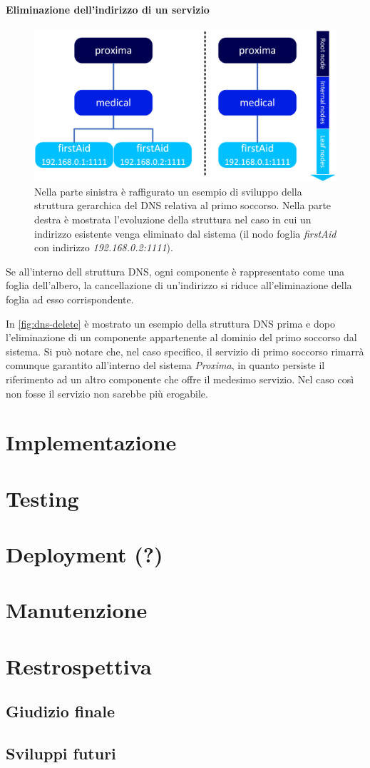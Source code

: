 \documentclass[a4paper,12pt]{report}
\begin{document}
\subsubsection{Eliminazione dell'indirizzo di un servizio}
\begin{figure}[H]
	\centering
	\includegraphics[scale=0.7]{./img/dns-delete.png}
	\caption{Nella parte sinistra è raffigurato un esempio di sviluppo della struttura gerarchica del DNS relativa al primo soccorso. Nella parte destra è mostrata l'evoluzione della struttura nel caso in cui un indirizzo esistente venga eliminato dal sistema (il nodo foglia \emph{firstAid} con indirizzo \emph{192.168.0.2:1111}). }
	\label{fig:dns-delete}
\end{figure}
Se all'interno dell struttura DNS, ogni componente è rappresentato come una foglia dell'albero, la cancellazione di un'indirizzo si riduce all'eliminazione della foglia ad esso corrispondente. 

In \autoref{fig:dns-delete} è mostrato un esempio della struttura DNS prima e dopo l'eliminazione di un componente appartenente al dominio del primo soccorso dal sistema. Si può notare che, nel caso specifico, il servizio di primo soccorso rimarrà comunque garantito all'interno del sistema \emph{Proxima}, in quanto persiste il riferimento ad un altro componente che offre il medesimo servizio. Nel caso così non fosse il servizio non sarebbe più erogabile.

\chapter{Implementazione}

\chapter{Testing} 

\chapter{Deployment (?)}

\chapter{Manutenzione}

\chapter{Restrospettiva}
\section{Giudizio finale}
\section{Sviluppi futuri}

 
\end{document}
